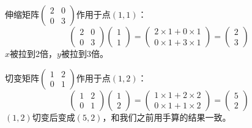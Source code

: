 \begin{example}
伸缩矩阵$\begin{pmatrix}2&0\\0&3\end{pmatrix}$作用于点$(1,1)$：
\[
\begin{pmatrix}2&0\\0&3\end{pmatrix}\begin{pmatrix}1\\1\end{pmatrix}
= \begin{pmatrix}2\times1+0\times1\\0\times1+3\times1\end{pmatrix}
= \begin{pmatrix}2\\3\end{pmatrix}
\]
$x$被拉到$2$倍，$y$被拉到$3$倍。
\end{example}

\begin{example}
切变矩阵$\begin{pmatrix}1&2\\0&1\end{pmatrix}$作用于点$(1,2)$：
\[
\begin{pmatrix}1&2\\0&1\end{pmatrix}\begin{pmatrix}1\\2\end{pmatrix}
= \begin{pmatrix}1\times1+2\times2\\0\times1+1\times2\end{pmatrix}
= \begin{pmatrix}5\\2\end{pmatrix}
\]
$(1,2)$切变后变成$(5,2)$，和我们之前用手算的结果一致。
\end{example}

